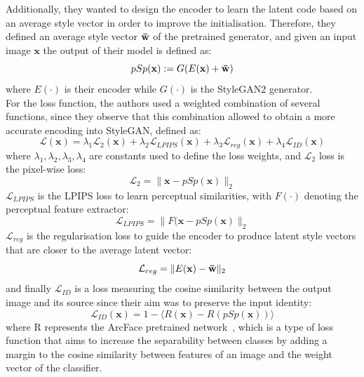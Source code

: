 \noindent Additionally, they wanted to design the encoder to learn the latent code based on an average style vector in order to improve the initialisation. Therefore, they defined an average style vector $\mathbf{\Bar{w}}$ of the pretrained generator, and given an input image $\mathbf{x}$ the output of their model is defined as:
\begin{equation}
    pSp(\mathbf{x}) := G(E(\mathbf{x}) + \mathbf{\Bar{w}})
\end{equation}
where $E(\cdot)$ is their encoder while $G(\cdot)$ is the StyleGAN2 generator.\\
For the loss function, the authors used a weighted combination of several functions, since they observe that this combination allowed to obtain a more accurate encoding into StyleGAN, defined as: 
\begin{equation}
    \label{eq:pSpTotalLoss}
    \mathcal{L}(\mathbf{x}) = \lambda_1 \mathcal{L}_2(\mathbf{x}) + \lambda_2 \mathcal{L}_{LPIPS}(\mathbf{x}) + \lambda_3\mathcal{L}_{reg}(\mathbf{x}) + \lambda_4\mathcal{L}_{ID}(\mathbf{x})
\end{equation}
where $\lambda_1,\lambda_2,\lambda_3,\lambda_4$ are constants used to define the loss weights, and $\mathcal{L}_2$ loss is the pixel-wise loss:
\begin{equation}
    \label{eq:l2Loss}
    \mathcal{L}_2 =  \| \mathbf{x} - pSp(\mathbf{x})  \|_2
\end{equation}
 $\mathcal{L}_{LPIPS}$ is the LPIPS loss to learn perceptual similarities, with $F(\cdot)$ denoting the perceptual feature extractor:
\begin{equation}
    \label{eq:lpips-loss}
    \mathcal{L}_{LPIPS} = \| F(\mathbf{x} - pSp(\mathbf{x}) \|_2
\end{equation}
$ \mathcal{L}_{reg}$ is the regularisation loss to guide the encoder to produce latent style vectors that are closer to the average latent vector:
\begin{equation}
    \label{eq:regularizationLoss-psp}
    \mathcal{L}_{reg} = \| E(\mathbf{x}) - \mathbf{\Bar{w}}\| _2
\end{equation}
and finally $ \mathcal{L}_{ID}$ is a loss measuring the cosine similarity between the output image and its source since their aim was to preserve the input identity:
\begin{equation}
    \label{eq:identityLoss}
    \mathcal{L}_{ID}(\mathbf{x}) = 1 - \langle R(\mathbf{x}) - R(pSp(\mathbf{x}))\rangle
\end{equation}
where R represents the ArcFace pretrained network~\cite{arcface2018}, which is a type of loss function that aims to increase the separability between classes by adding a margin to the cosine similarity between features of an image and the weight vector of the classifier.
